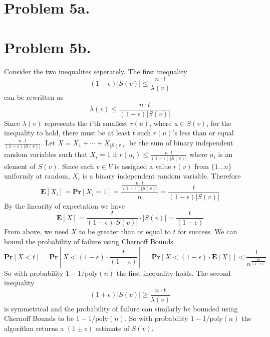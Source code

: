 \documentclass[12pt]{article}
\begin{document}
\pagestyle{plain}
\titleformat{\subsection}[runin]
  {\normalfont\large\bfseries}{\thesubsection}{1em}{}
\titleformat{\subsubsection}[runin]
  {\normalfont\large\bfseries}{\thesubsubsection}{1em}{}

\section*{Problem 5a.}

\section*{Problem 5b.}
Consider the two inequalites seperately. The first inequality
$$ (1-\epsilon)|S(v)| \le \frac{n\cdot t}{\lambda(v)} $$
can be rewritten as
$$ \lambda(v) \le \frac{n\cdot t}{(1-\epsilon)|S(v)|} $$
Since $\lambda(v)$ represents the $t$'th smallest $r(u)$, where $u \in S(v)$,
for the inequality to hold, there must be at least $t$ such
$r(u)$'s less than or equal $\frac{n\cdot t}{(1-\epsilon)|S(v)|}$. Let
$X = X_1 + \cdots + X_{|S(v)|}$ be the sum of binary independent random variables
such that $X_i = 1$ if $r(u_i) \le \frac{n\cdot t}{(1-\epsilon)|S(v)|}$ where
$u_i$ is an element of $S(v)$. Since each $v \in V$ is assigned a value $r(v)$
from $\{1...n\}$ uniformly at random, $X_i$ is a binary independent random
variable. Therefore
$$\textbf{E}[X_i] = \textbf{Pr}[X_i = 1] =
\frac{\frac{n\cdot t}{(1-\epsilon)|S(v)|}}{n} =
\frac{t}{(1-\epsilon)|S(v)|}$$
By the linearity of expectation we have
$$\textbf{E}[X] = \frac{t}{(1-\epsilon)|S(v)|}\cdot |S(v)| =
\frac{t}{(1-\epsilon)}$$
From above, we need $X$ to be greater than or equal to $t$ for success. We can
bound the probability of failure using Chernoff Bounds
$$\textbf{Pr}[X < t] = \textbf{Pr}[X < (1-\epsilon)\cdot\frac{t}{(1-\epsilon)}]=
\textbf{Pr}[X < (1-\epsilon)\cdot\textbf{E}[X]] <
\frac{1}{n^{\frac{18}{(1-\epsilon)}}}$$
So with probability $1-1/\text{poly}(n)$ the first inequality holds. The second
inequality
$$ (1+\epsilon)|S(v)| \ge \frac{n\cdot t}{\lambda(v)} $$
is symmetrical and the probability of failure can similarly be bounded using
Chernoff Bounds to be $1-1/\text{poly}(n)$. So with probability
$1-1/\text{poly}(n)$ the algorithm returns a $(1 \pm \epsilon)$ estimate of
$S(v)$.
\end{document}
